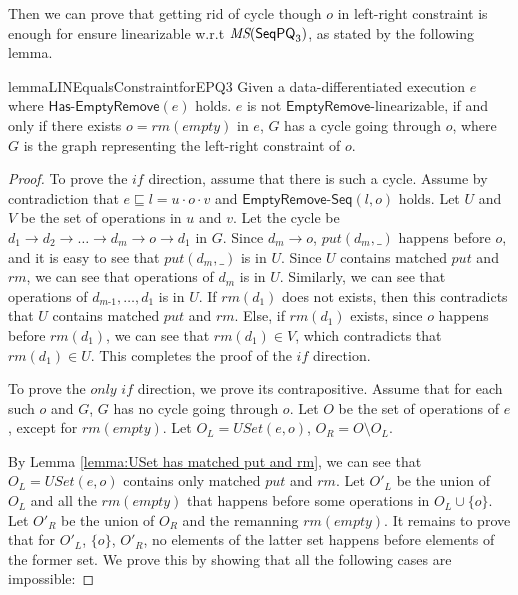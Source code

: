 Then we can prove that getting rid of cycle though $o$ in left-right constraint is enough for ensure linearizable w.r.t $\textit{MS}(\mathsf{SeqPQ}_3)$, as stated by the following lemma.


\begin{restatable}{lemma}{LINEqualsConstraintforEPQ3}
\label{lemma:Lin Equals Constraint for EPQ3}
Given a data-differentiated execution $e$ where $\mathsf{Has\text{-}EmptyRemove}(e)$ holds. $e$ is not $\mathsf{EmptyRemove}$-linearizable, if and only if there exists $o = \textit{rm}(\textit{empty})$ in $e$, $G$ has a cycle going through $o$, where $G$ is the graph representing the left-right constraint of $o$.
\end{restatable}

\begin {proof}

To prove the $\textit{if}$ direction, assume that there is such a cycle. Assume by contradiction that $e \sqsubseteq l= u \cdot o \cdot v$ and $\mathsf{EmptyRemove\text{-}Seq}(l,o)$ holds. Let $U$ and $V$ be the set of operations in $u$ and $v$. Let the cycle be $d_1 \rightarrow d_2 \rightarrow \ldots \rightarrow d_m \rightarrow o \rightarrow d_1$ in $G$. Since $d_m \rightarrow o$, $\textit{put}(d_m,\_)$ happens before $o$, and it is easy to see that $\textit{put}(d_m,\_)$ is in $U$. Since $U$ contains matched $\textit{put}$ and $\textit{rm}$, we can see that operations of $d_m$ is in $U$. Similarly, we can see that operations of $d_{\textit{m-1}},\ldots,d_1$ is in $U$. If $\textit{rm}(d_1)$ does not exists, then this contradicts that $U$ contains matched $\textit{put}$ and $\textit{rm}$. Else, if $\textit{rm}(d_1)$ exists, since $o$ happens before $\textit{rm}(d_1)$, we can see that $\textit{rm}(d_1) \in V$, which contradicts that $\textit{rm}(d_1) \in U$. This completes the proof of the $\textit{if}$ direction.

To prove the $\textit{only if}$ direction, we prove its contrapositive. Assume that for each such $o$ and $G$, $G$ has no cycle going through $o$. Let $O$ be the set of operations of $e$, except for $\textit{rm}(\textit{empty})$. Let $O_L = \textit{USet}(e,o)$, $O_R = O \setminus O_L$.

By Lemma \ref{lemma:USet has matched put and rm}, we can see that $O_L = \textit{USet}(e,o)$ contains only matched $\textit{put}$ and $\textit{rm}$. Let $O'_L$ be the union of $O_L$ and all the $\textit{rm}(\textit{empty})$ that happens before some operations in $O_L \cup \{ o \}$. Let $O'_R$ be the union of $O_R$ and the remanning $\textit{rm}(\textit{empty})$. It remains to prove that for $O'_L$, $\{ o \}$, $O'_R$, no elements of the latter set happens before elements of the former set. We prove this by showing that all the following cases are impossible:


\end{proof}
